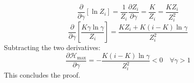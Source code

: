 \documentclass[conference,10pt]{IEEEtran}
\begin{document}
\begin{IEEEproof}
\begin{equation}
\label{eq:term1_deriv}
\frac{\partial}{\partial\gamma}[\ln Z_i] = \frac{1}{Z_i}\frac{\partial Z_i}{\partial\gamma} = \frac{K}{Z_i} = \frac{K Z_i}{Z_i^2}
\end{equation}
\begin{equation}
\label{eq:term2_deriv}
\frac{\partial}{\partial\gamma}\left[\frac{K\gamma\ln\gamma}{Z_i}\right] = \frac{K Z_i + K(i - K)\ln\gamma}{Z_i^2}
\end{equation}
Subtracting the two derivatives:
\begin{equation}
\label{eq:strict_neg_deriv}
\frac{\partial\mathcal{H}_{\max}}{\partial\gamma} = -\frac{K(i - K)\ln\gamma}{Z_i^2} < 0 \quad \forall \gamma > 1
\end{equation}
This concludes the proof.
\end{IEEEproof}
\end{document}
